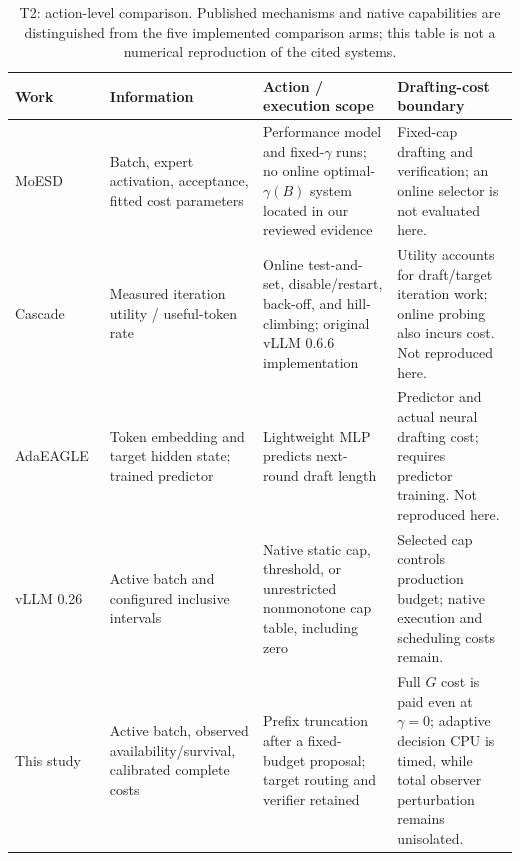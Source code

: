 \begin{table}[t]
\centering\small
\caption{T2: action-level comparison. Published mechanisms and native capabilities are distinguished from the five implemented comparison arms; this table is not a numerical reproduction of the cited systems.}
\label{tab:t2actions}
\begin{tabularx}{\textwidth}{@{}>{\raggedright\arraybackslash}p{}>{\raggedright\arraybackslash}p{}>{\raggedright\arraybackslash}p{}>{\raggedright\arraybackslash}X@{}}
\toprule
Work & Information & Action / execution scope & Drafting-cost boundary \\\midrule
MoESD~\cite{moesd} & Batch, expert activation, acceptance, fitted cost parameters & Performance model and fixed-$\gamma$ runs; no online optimal-$\gamma(B)$ system located in our reviewed evidence & Fixed-cap drafting and verification; an online selector is not evaluated here. \\
Cascade~\cite{cascade} & Measured iteration utility / useful-token rate & Online test-and-set, disable/restart, back-off, and hill-climbing; original vLLM 0.6.6 implementation & Utility accounts for draft/target iteration work; online probing also incurs cost. Not reproduced here. \\
AdaEAGLE~\cite{adaeagle} & Token embedding and target hidden state; trained predictor & Lightweight MLP predicts next-round draft length & Predictor and actual neural drafting cost; requires predictor training. Not reproduced here. \\
vLLM 0.26~\cite{vllmdynamic,vllmconfig} & Active batch and configured inclusive intervals & Native static cap, threshold, or unrestricted nonmonotone cap table, including zero & Selected cap controls production budget; native execution and scheduling costs remain. \\
This study & Active batch, observed availability/survival, calibrated complete costs & Prefix truncation after a fixed-budget proposal; target routing and verifier retained & Full $G$ cost is paid even at $\gamma=0$; adaptive decision CPU is timed, while total observer perturbation remains unisolated. \\
\bottomrule
\end{tabularx}
\end{table}
